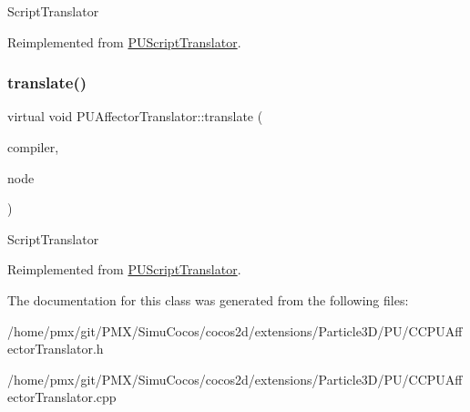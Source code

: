 Script\+Translator 

Reimplemented from \hyperlink{classPUScriptTranslator_a9ff2cdfda9ea8db6fd716e7b69dbe79b}{P\+U\+Script\+Translator}.

\mbox{\label{classPUAffectorTranslator_adc3a736d93e089a8aa95921aa0a5aeb8}} 
\subsubsection{\texorpdfstring{translate()}{translate()}\hspace{0.1cm}{\footnotesize\ttfamily [2/2]}}
{\footnotesize\ttfamily virtual void P\+U\+Affector\+Translator\+::translate (\begin{DoxyParamCaption}\item[{\hyperlink{classPUScriptCompiler}{P\+U\+Script\+Compiler} $\ast$}]{compiler,  }\item[{\hyperlink{classPUAbstractNode}{P\+U\+Abstract\+Node} $\ast$}]{node }\end{DoxyParamCaption})\hspace{0.3cm}{\ttfamily [virtual]}}

Script\+Translator 

Reimplemented from \hyperlink{classPUScriptTranslator_a9ff2cdfda9ea8db6fd716e7b69dbe79b}{P\+U\+Script\+Translator}.



The documentation for this class was generated from the following files\+:\begin{DoxyCompactItemize}
\item 
/home/pmx/git/\+P\+M\+X/\+Simu\+Cocos/cocos2d/extensions/\+Particle3\+D/\+P\+U/C\+C\+P\+U\+Affector\+Translator.\+h\item 
/home/pmx/git/\+P\+M\+X/\+Simu\+Cocos/cocos2d/extensions/\+Particle3\+D/\+P\+U/C\+C\+P\+U\+Affector\+Translator.\+cpp\end{DoxyCompactItemize}
